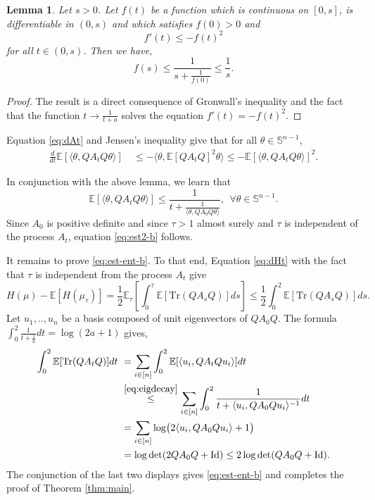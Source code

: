 \documentclass[12pt]{article}
\def \Sph{\mathbb{S}^{n-1}}
\def \Tr {\mathrm{Tr}}
\def \EE {\mathbb E}
\def \Id {\mathrm{Id}}
\newtheorem{lemma}[theorem]{Lemma}
\theoremstyle{definition}
\theoremstyle{remark}
\begin{document}
\begin{lemma} \label{lem:Gronwall}
Let $s > 0$. Let $f(t)$ be a function which is continuous on $[0,s]$, is differentiable in $(0, s)$ and which satisfies $f(0) > 0$ and
$$
f'(t) \leq - f(t)^2
$$
for all $t \in (0,s)$. Then we have,
$$
f(s) \leq \frac{1}{s + \tfrac{1}{f(0)}} \leq \frac{1}{s}.
$$
\end{lemma}
\begin{proof}
The result is a direct consequence of Gronwall's inequality and the fact that the function $t \to \frac{1}{t+a}$ solves the equation $f'(t) = - f(t)^2$.
\end{proof}

Equation \eqref{eq:dAt} and Jensen's inequality give that for all $\theta \in \Sph$, 
\begin{align*}
\frac{d}{dt} \EE[\langle \theta, Q A_t Q \theta \rangle ] ~& \leq - \langle \theta, \EE [QA_tQ]^2 \theta \rangle \leq - \EE [\langle \theta, QA_tQ \theta \rangle]^2.
\end{align*}

In conjunction with the above lemma, we learn that
\begin{equation}\label{eq:eigdecay}
\EE[\langle \theta, QA_tQ \theta \rangle] \leq \frac{1}{t + \frac{1}{\langle \theta, QA_0Q \theta \rangle}}, ~~ \forall \theta \in \Sph.
\end{equation}
Since $A_0$ is positive definite and since $\tau > 1$ almost surely and $\tau$ is independent of the process $A_t$, equation \eqref{eq:est2-b} follows. 

It remains to prove \eqref{eq:est-ent-b}. To that end, Equation \eqref{eq:dHt} with the fact that $\tau$ is independent from the process $A_t$ give
$$
H(\mu) - \EE[H(\mu_\tau)] = \frac{1}{2} \EE_\tau \left [ \int_0^\tau \EE[\Tr(QA_sQ)] ds \right ] \leq \frac{1}{2} \int_0^2 \EE[\Tr(QA_sQ)] ds.
$$
Let $u_1,..,u_n$ be a basis composed of unit eigenvectors of $QA_0Q$. The formula $\int_0^2 \frac{1}{t + \frac{1}{a}} d t = \log(2 a + 1)$ gives,
\begin{align*}
\int_0^2 \EE[\Tr(QA_tQ)] dt  ~& = \sum_{i \in [n]} \int_0^2 \EE[\langle u_i, QA_tQ u_i \rangle] dt   \\
& \stackrel{\eqref{eq:eigdecay}}{\leq} \sum_{i \in [n]} \int_0^2 \frac{1}{t + \langle u_i, QA_0Q u_i \rangle^{-1}} dt  \\
& =  \sum_{i \in [n]} \log \bigl (2 \langle u_i, Q A_0 Q u_i \rangle + 1 \bigr)  \\
& = \log \det (2 Q A_0 Q + \Id) \leq 2\log \det (Q A_0 Q + \Id).
\end{align*}
The conjunction of the last two displays gives \eqref{eq:est-ent-b} and completes the proof of Theorem \ref{thm:main}.
\end{document}
